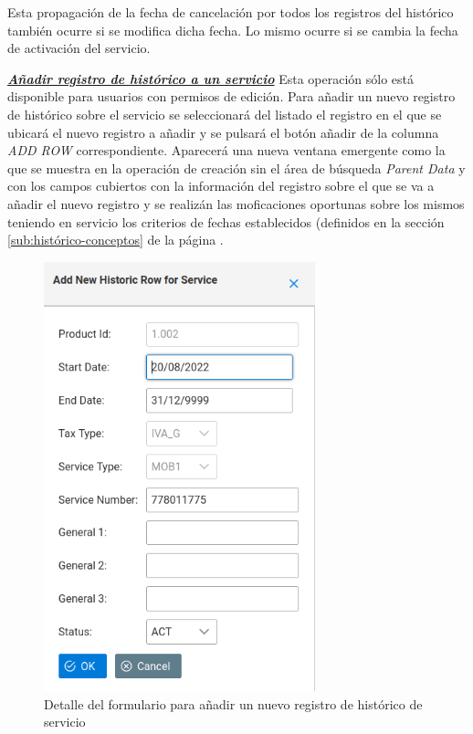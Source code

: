 Esta propagación de la fecha de cancelación por todos los registros del histórico  también ocurre si se modifica dicha fecha. Lo mismo ocurre si se cambia la fecha de activación del servicio.

\underline{\textsl{\textbf{Añadir registro de histórico a un servicio}}}\newline
Esta operación sólo está disponible para usuarios con permisos de edición.
Para añadir un nuevo registro de histórico sobre el servicio se seleccionará del listado el registro en el que se ubicará el nuevo registro a añadir y se pulsará el botón añadir de la columna \textit{ADD ROW} correspondiente. Aparecerá una nueva ventana emergente como la que se muestra en la operación de creación sin el área de búsqueda \emph{Parent Data} y con los campos cubiertos con la información del registro sobre el que se va a añadir el nuevo registro y se realizán las moficaciones oportunas sobre los mismos teniendo en servicio los criterios de fechas establecidos (definidos en la sección \ref{sub:histórico-conceptos} de la página \pageref{sub:histórico-conceptos}.

\begin{figure}[H]
  \centering
  \includegraphics[width=0.70\textwidth]{imaxes/nuevo-historico-servicio.png}
  \caption{Detalle del formulario para añadir un nuevo registro de histórico de servicio}
  \label{fig:nuevo-historico-servicio}
\end{figure}



